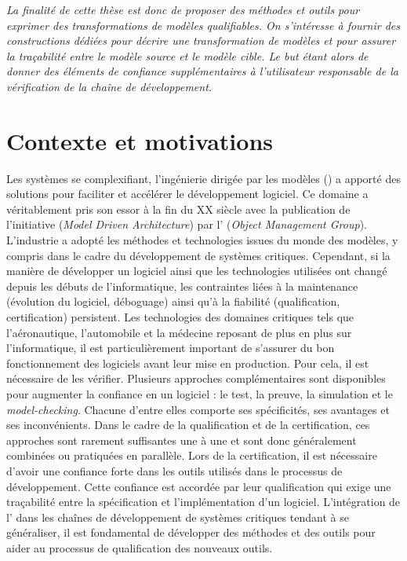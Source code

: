\textit{La finalité de cette thèse est donc de proposer des méthodes et outils pour
exprimer des transformations de modèles qualifiables. On s'intéresse à fournir
des constructions dédiées pour décrire une transformation de modèles et pour
assurer la traçabilité entre le modèle source et le modèle cible. Le but étant
alors de donner des éléments de confiance supplémentaires à l'utilisateur
responsable de la vérification de la chaîne de développement.}

\newpage


\section*{Contexte et motivations}


Les systèmes se complexifiant, l'ingénierie dirigée par les modèles ({\idm}) a
apporté des solutions pour faciliter et accélérer le développement logiciel. Ce
domaine a véritablement pris son essor à la fin du XX siècle avec la
publication de l'initiative {\mda} (\emph{Model Driven Architecture}) par
l'{\omg} (\emph{Object Management Group}). L'industrie a adopté les méthodes et
technologies issues du monde des modèles, y compris dans le cadre du
développement de systèmes critiques. Cependant, si la manière de développer un
logiciel ainsi que les technologies utilisées ont changé depuis les débuts de
l'informatique, les contraintes liées à la maintenance (évolution du logiciel,
déboguage) ainsi qu'à la fiabilité (qualification, certification) persistent.
Les technologies des domaines critiques tels que l'aéronautique, l'automobile
et la médecine reposant de plus en plus sur l'informatique, il est
particulièrement important de s'assurer du bon fonctionnement des logiciels
avant leur mise en production. Pour cela, il est nécessaire de les vérifier.
Plusieurs approches complémentaires sont disponibles pour augmenter la
confiance en un logiciel : le test, la preuve, la simulation et le
\emph{model-checking}. Chacune d'entre elles comporte ses spécificités, ses
avantages et ses inconvénients. Dans le cadre de la qualification et de la
certification, ces approches sont rarement suffisantes une à une et sont donc
généralement combinées ou pratiquées en parallèle. Lors de la certification, il
est nécessaire d'avoir une confiance forte dans les outils utilisés dans le
processus de développement. Cette confiance est accordée par leur qualification
qui exige une traçabilité entre la spécification et l'implémentation d'un
logiciel. L'intégration de l'{\idm} dans les chaînes de développement de
systèmes critiques tendant à se généraliser, il est fondamental de développer
des méthodes et des outils pour aider au processus de qualification des
nouveaux outils.

